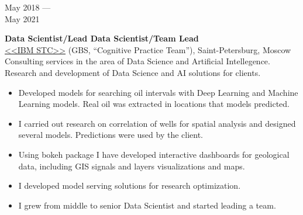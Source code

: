 \documentclass[10pt,a4paper]{article}
\newcommand{\lmpratio}{0.15}
\newcommand{\rmpratio}{0.74}
\newcommand{\vSpace}{0.5cm}
\newcommand{\horizontalSpace}{0.05\textwidth}
\newcommand{\sectionMain}[1]{\textbf{#1}}
\begin{document}
	\begin{minipage}[t]{\lmpratio\textwidth}
		May 2018 --- \\May 2021
	\end{minipage}
	\hspace{\horizontalSpace}
	\begin{minipage}[t]{\rmpratio\textwidth}
		\sectionMain{Data Scientist/Lead Data Scientist/Team Lead}\\
		\href{https://www.ibm.com/ru/rstl/index-en.html}{<<IBM STC>>} (GBS, ``Cognitive Practice Team''), Saint-Petersburg, Moscow\\[0.1cm]
  
Consulting services in the area of Data Science and Artificial Intellegence.
Research and development of Data Science and AI solutions for clients.
  
		\begin{itemize}
                \item 
Developed models for searching oil intervals with Deep Learning and Machine Learning models.
Real oil was extracted in locations that models predicted.
                \item 
I carried out research on correlation of wells for spatial analysis and designed several models.
Predictions were used by the client.
                \item
Using bokeh package I have developed interactive dashboards for geological data, including GIS signals and layers visualizations and maps.
                \item
I developed model serving solutions for research optimization.
                \item
I grew from middle to senior Data Scientist and started leading a team.
            \end{itemize}
		
	\end{minipage}	
	\vspace{\vSpace}
	
\end{document}
